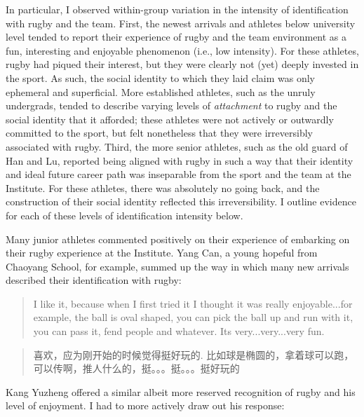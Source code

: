 \begin{CJK}{UTF8}{gbsn}
In particular, I observed within-group variation in the intensity of identification with rugby and the team.  First, the newest arrivals and athletes below university level tended to report their experience of rugby and the team environment as a fun, interesting and enjoyable phenomenon (i.e., low intensity). For these athletes, rugby had piqued their interest, but they were clearly not (yet) deeply invested in the sport.  As such, the social identity to which they laid claim was only ephemeral and superficial.  More established athletes, such as the unruly undergrads, tended to describe varying levels of \textit{attachment} to rugby and the social identity that it afforded; these athletes were not actively or outwardly committed to the sport, but felt nonetheless that they were irreversibly associated with rugby.  Third, the more senior athletes, such as the old guard of Han and Lu, reported being aligned with rugby in such a way that their identity and ideal future career path was inseparable from the sport and the team at the Institute.  For these athletes, there was absolutely no going back, and the construction of their social identity reflected this irreversibility.  I outline evidence for each of these levels of identification intensity below.


Many junior athletes commented positively on their experience of embarking on their rugby experience at the Institute.   Yang Can, a young hopeful from Chaoyang School, for example, summed up the way in which many new arrivals described their identification with rugby:

      \begin{quote}
        I like it, because when I first tried it I thought it was really enjoyable...for example, the ball is oval shaped, you can pick the ball up and run with it, you can pass it, fend people and whatever.  Its very...very...very fun.
      \end{quote}

      \begin{quote}
        喜欢，应为刚开始的时候觉得挺好玩的.	比如球是椭圆的，拿着球可以跑，可以传啊，推人什么的，挺。。。挺。。。挺好玩的 
      \end{quote}

Kang Yuzheng offered a similar albeit more reserved recognition of rugby and his level of enjoyment.  I had to more actively draw out his response:


\end{CJK}

